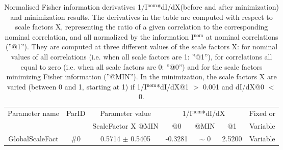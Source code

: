 \begin{table}[H]
\scriptsize
\begin{center}
\renewcommand{\arraystretch}{1.1}
\begin{tabular}{|c|c|c|ccc|c|}
\hline
Parameter name & ParID & Parameter value &\multicolumn{3}{|c|}{1/I$^\mathrm{nom}$*dI/dX} &Fixed or\\
 & & ScaleFactor X @MIN & @0 & @MIN & @1 & Variable\\
\hline
 {\tiny GlobalScaleFact} & \#0 &    0.5714 $\pm$    0.5405 &   -0.3281 & {\tiny $\sim$ }0 &    2.5200 & Variable \\
\hline
\end{tabular}
\renewcommand{\arraystretch}{1}
\caption{Normalised Fisher information derivatives 1/I$^\mathrm{nom}$*dI/dX(before and after minimization) and minimization results.  The derivatives in the table are computed with respect to scale factors X, representing the ratio of a given correlation to the corresponding nominal correlation, and all normalized by the information I$^\mathrm{nom}$ at nominal correlations (''@1''). They are computed at three different values of the scale factors X: for nominal values of all correlations (i.e. when all scale factors are 1: ''@1''), for correlations all equal to zero (i.e. when all scale factors are 0: ''@0'') and for the scale factors minimizing Fisher information (''@MIN''). In the minimization, the scale factors X are varied (between 0 and 1, starting at 1) if 1/I$^\mathrm{nom}$*dI/dX@1 $>$ 0.001 and dI/dX@0 $<$ 0.}
\end{center}
\end{table}

